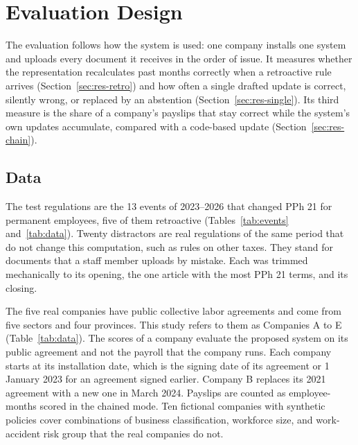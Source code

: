 \section{Evaluation Design}
\label{sec:design}
The evaluation follows how the system is used: one company installs one system and uploads every document it receives in the order of issue. It measures whether the representation recalculates past months correctly when a retroactive rule arrives (Section~\ref{sec:res-retro}) and how often a single drafted update is correct, silently wrong, or replaced by an abstention (Section~\ref{sec:res-single}). Its third measure is the share of a company's payslips that stay correct while the system's own updates accumulate, compared with a code-based update (Section~\ref{sec:res-chain}).

\subsection{Data}
\label{sec:data}
The test regulations are the 13 events of 2023--2026 that changed PPh 21 for permanent employees, five of them retroactive (Tables~\ref{tab:events} and~\ref{tab:data}). Twenty distractors are real regulations of the same period that do not change this computation, such as rules on other taxes. They stand for documents that a staff member uploads by mistake. Each was trimmed mechanically to its opening, the one article with the most PPh 21 terms, and its closing.

The five real companies have public collective labor agreements and come from five sectors and four provinces. This study refers to them as Companies A to E (Table~\ref{tab:data}). The scores of a company evaluate the proposed system on its public agreement and not the payroll that the company runs. Each company starts at its installation date, which is the signing date of its agreement or 1 January 2023 for an agreement signed earlier. Company B replaces its 2021 agreement with a new one in March 2024. Payslips are counted as employee-months scored in the chained mode. Ten fictional companies with synthetic policies cover combinations of business classification, workforce size, and work-accident risk group that the real companies do not.

